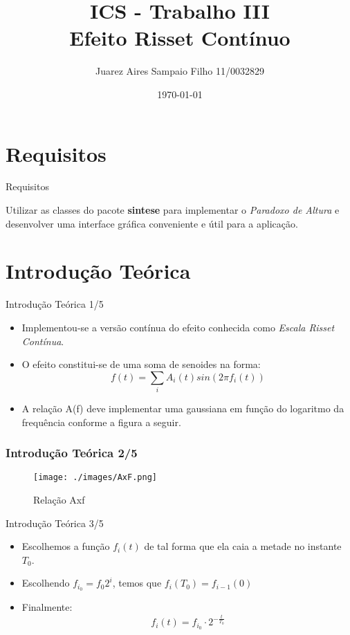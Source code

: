 \documentclass{beamer}
\title[Introdução a Computação Sônica]{ ICS - Trabalho III \\ Efeito Risset Contínuo}
\author{Juarez Aires Sampaio Filho 11/0032829}
\institute{Universidade de Brasília}
\date{\today}
\begin{document}
\begin{frame}
        \titlepage
\end{frame}

\AtBeginSection[]
{
}
\section{Requisitos}
\begin{frame}{Requisitos}
	\begin{block}{}
	Utilizar as classes do pacote \textbf{sintese} para implementar o \emph{Paradoxo de Altura} e desenvolver uma interface gráfica conveniente e útil para a aplicação.
	\end{block}
\end{frame}

\section{Introdução Teórica}
\begin{frame}{Introdução Teórica 1/5}
\begin{itemize}
\item Implementou-se a versão contínua do efeito conhecida como \emph{Escala Risset Contínua}.
\item O efeito constitui-se de uma soma de senoides na forma:
\begin{equation}
	f(t) = \sum_{i} A_i(t) sin(2 \pi f_i(t))
\end{equation}
\item A relação A(f) deve implementar uma gaussiana em função do logaritmo da frequência
conforme a figura a seguir.
\end{itemize}
\end{frame}

\begin{frame}
 \frametitle{Introdução Teórica 2/5}
 \begin{figure}
  \texttt{[image: ./images/AxF.png]}
  \caption{Relação Axf}
   \end{figure}
\end{frame}


\begin{frame}{Introdução Teórica 3/5}
\begin{itemize}
\item Escolhemos a função $f_i(t)$ de tal forma que ela caia a metade no instante $T_0$.
\item Escolhendo $f_{i_0} = f_0 2^i$, temos que $f_i(T_0) = f_{i-1}(0)$
\item Finalmente:
	\begin{equation}
		f_i(t) = f_{i_0}\cdot 2^{-\frac{t}{T_0}}
	\end{equation}
\end{itemize}
\end{frame}
\end{document}
